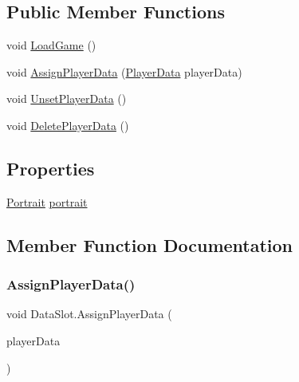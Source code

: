 \subsection*{Public Member Functions}
\begin{DoxyCompactItemize}
\item 
void \mbox{\hyperlink{class_data_slot_a8c5e92e015138b1ec785465db9ff65a6}{Load\+Game}} ()
\item 
void \mbox{\hyperlink{class_data_slot_a104284ff9c03da56e871e2f39d345e0b}{Assign\+Player\+Data}} (\mbox{\hyperlink{class_player_data}{Player\+Data}} player\+Data)
\item 
void \mbox{\hyperlink{class_data_slot_a2d8c55c9436701f7d2a12ab7388dcdec}{Unset\+Player\+Data}} ()
\item 
void \mbox{\hyperlink{class_data_slot_aae68b8b9d2f07c2d634e82493d29c05d}{Delete\+Player\+Data}} ()
\end{DoxyCompactItemize}
\subsection*{Properties}
\begin{DoxyCompactItemize}
\item 
\mbox{\hyperlink{class_portrait}{Portrait}} \mbox{\hyperlink{class_data_slot_abe2454953aa5b018407db6ebbdc18083}{portrait}}
\end{DoxyCompactItemize}


\subsection{Member Function Documentation}
\mbox{\label{class_data_slot_a104284ff9c03da56e871e2f39d345e0b}} 
\subsubsection{\texorpdfstring{AssignPlayerData()}{AssignPlayerData()}}
{\footnotesize\ttfamily void Data\+Slot.\+Assign\+Player\+Data (\begin{DoxyParamCaption}\item[{\mbox{\hyperlink{class_player_data}{Player\+Data}}}]{player\+Data }\end{DoxyParamCaption})}


